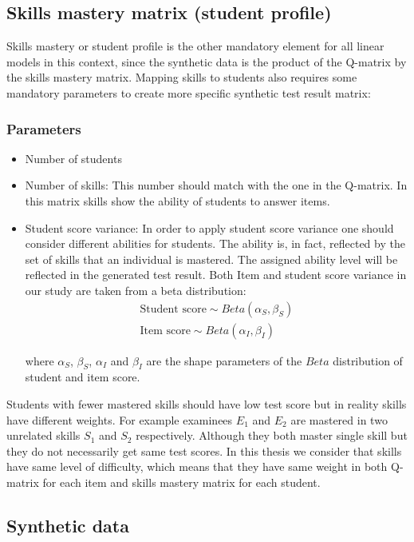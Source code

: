 \subsection{Skills mastery matrix (student profile)}
\label{Student_Profile}
Skills mastery or student profile is the other mandatory element for all linear models in this context, since the synthetic data is the product of the Q-matrix by the skills mastery matrix. Mapping skills to students also requires some mandatory parameters to create more specific synthetic test result matrix:
\subsubsection{Parameters}
\begin{itemize}
\item Number of students 
\item Number of skills: This number should match with the one in the Q-matrix. In this matrix skills show the ability of students to answer items.
\item Student score variance: In order to apply student score variance one should consider different abilities for students. The ability is, in fact, reflected by the set of skills that an individual is mastered. The assigned ability level will be reflected in the generated test result. Both Item and student score variance in our study are taken from a beta distribution:
\begin{eqnarray*}
\textrm{Student score} \sim Beta(\alpha_S, \beta_S)\\
\textrm{Item score} \sim Beta(\alpha_I, \beta_I)
\end{eqnarray*}

where $\alpha_S$, $\beta_S$, $\alpha_I$ and $\beta_I$ are the shape parameters of the $Beta$ distribution of student and item score.

\end{itemize}

Students with fewer mastered skills should have low test score but in reality skills have different weights. For example examinees $E_1$ and $E_2$ are mastered in two unrelated skills $S_1$ and $S_2$ respectively. Although they both master single skill but they do not necessarily get same test scores. In this thesis we consider that skills have same level of difficulty, which means that they have same weight in both Q-matrix for each item and skills mastery matrix for each student. 


\subsection{Synthetic data}


